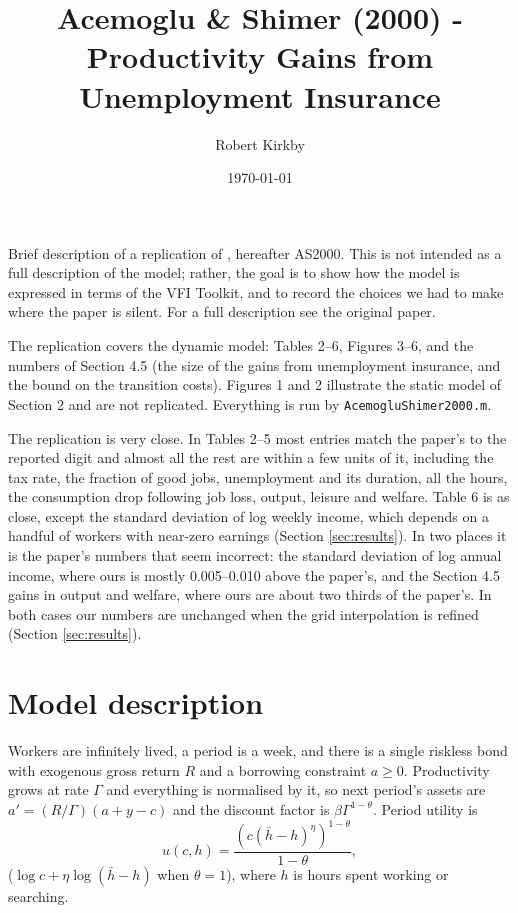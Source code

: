 \documentclass[11pt,fleqn]{article}
\begin{document}
\sloppy

\newcommand{\rob}[1]{{\noindent\color{blue}\bf #1}}
\newcommand{\robc}[1]{{\noindent\color{blue}\bf R: #1}}

\title{Acemoglu \& Shimer (2000) - Productivity Gains from Unemployment Insurance}
\author{Robert Kirkby}
\date{\today}
\maketitle

Brief description of a replication of \cite*{AcemogluShimer2000}, hereafter AS2000. This is not intended as a full description of the model; rather, the goal is to show how the model is expressed in terms of the VFI Toolkit, and to record the choices we had to make where the paper is silent. For a full description see the original paper.

The replication covers the dynamic model: Tables 2--6, Figures 3--6, and the numbers of Section 4.5 (the size of the gains from unemployment insurance, and the bound on the transition costs). Figures 1 and 2 illustrate the static model of Section 2 and are not replicated. Everything is run by \verb|AcemogluShimer2000.m|.

The replication is very close. In Tables 2--5 most entries match the paper's to the reported digit and almost all the rest are within a few units of it, including the tax rate, the fraction of good jobs, unemployment and its duration, all the hours, the consumption drop following job loss, output, leisure and welfare. Table 6 is as close, except the standard deviation of log weekly income, which depends on a handful of workers with near-zero earnings (Section \ref{sec:results}). In two places it is the paper's numbers that seem incorrect: the standard deviation of log annual income, where ours is mostly 0.005--0.010 above the paper's, and the Section 4.5 gains in output and welfare, where ours are about two thirds of the paper's. In both cases our numbers are unchanged when the grid interpolation is refined (Section \ref{sec:results}).


\section{Model description}

Workers are infinitely lived, a period is a week, and there is a single riskless bond with exogenous gross return $R$ and a borrowing constraint $a\geq 0$. Productivity grows at rate $\Gamma$ and everything is normalised by it, so next period's assets are $a' = (R/\Gamma)(a + y - c)$ and the discount factor is $\beta\Gamma^{1-\theta}$. Period utility is
\begin{equation*}
u(c,h) = \frac{(c(\bar{h}-h)^\eta)^{1-\theta}}{1-\theta},
\end{equation*}
($\log c + \eta \log(\bar{h}-h)$ when $\theta=1$), where $h$ is hours spent working or searching.
\end{document}
